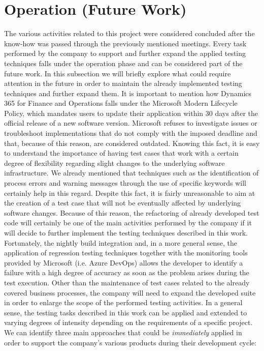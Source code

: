 \section{Operation (Future Work)} 

The various activities related to this project were considered concluded after the know-how was passed through the previously mentioned meetings. Every task performed by the company to support and further expand the applied testing techniques falls under the operation phase and can be considered part of the future work. In this subsection we will briefly explore what could require attention in the future in order to maintain the already implemented testing techniques and further expand them. 
It is important to mention how Dynamics 365 for Finance and Operations falls under the Microsoft Modern Lifecycle Policy, which mandates users to update their application within 30 days after the official release of a new software version. Microsoft refuses to investigate issues or troubleshoot implementations that do not comply with the imposed deadline and that, because of this reason, are considered outdated. Knowing this fact, it is easy to understand the importance of having test cases that work with a certain degree of flexibility regarding slight changes to the underlying software infrastructure. We already mentioned that techniques such as the identification of process errors and warning messages through the use of specific keywords will certainly help in this regard. Despite this fact, it is fairly unreasonable to aim at the creation of a test case that will not be eventually affected by underlying software changes. Because of this reason, the refactoring of already developed test code will certainly be one of the main activities performed by the company if it will decide to further implement the testing techniques described in this work. Fortunately, the nightly build integration and, in a more general sense, the application of regression testing techniques together with the monitoring tools provided by Microsoft (i.e. Azure DevOps) allows the developer to identify a failure with a high degree of accuracy as soon as the problem arises during the test execution. 
Other than the maintenance of test cases related to the already covered business processes, the company will need to expand the developed suite in order to enlarge the scope of the performed testing activities. 
In a general sense, the testing tasks described in this work can be applied and extended to varying degrees of intensity depending on the requirements of a specific project. We can identify three main approaches that could be \textit{immediately} applied in order to support the company's various products during their development cycle:
